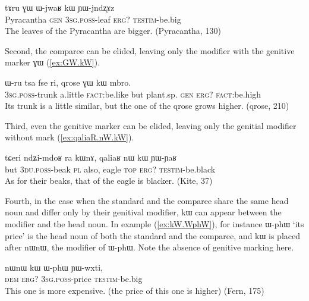 \documentclass[oldfontcommands,oneside,a4paper,11pt]{article}
\newcommand{\ipa}[1]{{\phon #1}} %
\begin{document}
\begin{exe}
\ex \label{ex:GW.WjwaR.kW}
\gll 
\ipa{tɤru}  	\ipa{ɣɯ}  	\ipa{ɯ-jwaʁ}  	\ipa{kɯ}  	\ipa{ɲɯ-jndʐɤz}  \\
Pyracantha \textsc{gen} \textsc{3sg.poss}-leaf \textsc{erg?} \textsc{testim}-be.big \\
\glt The leaves of the Pyracantha are bigger. (Pyracantha, 130)
 \end{exe}
Second,  the comparee can be elided, leaving only the modifier with the genitive marker \ipa{ɣɯ} (\ref{ex:GW.kW}).  
\begin{exe}
\ex \label{ex:GW.kW}
\gll 
\ipa{ɯ-ru}  	\ipa{tsa}  	\ipa{fse}  	\ipa{ri,}  	\ipa{qrose}  	\ipa{ɣɯ}  	\ipa{kɯ}  	\ipa{mbro.}  \\
\textsc{3sg.poss}-trunk a.little \textsc{fact}:be.like but plant.sp. \textsc{gen} \textsc{erg?} \textsc{fact}:be.high \\
\glt Its  trunk is a little similar, but the one of the \ipa{qrose} grows higher. (qrose, 210)
\end{exe}

Third, even the genitive marker can be elided, leaving only the genitial modifier without mark (\ref{ex:qaliaR.nW.kW}).
\begin{exe}
\ex \label{ex:qaliaR.nW.kW}
\gll 
\ipa{tɕeri}  	\ipa{ndʑi-mdoʁ}  	\ipa{ra}  	\ipa{kɯnɤ,}  	\ipa{qaliaʁ}  	\ipa{nɯ}  	\ipa{kɯ}  	\ipa{ɲɯ-ɲaʁ}  \\
but \textsc{3du.poss}-beak \textsc{pl} also, eagle \textsc{top} \textsc{erg?} \textsc{testim}-be.black \\
\glt As for their beaks, that of the eagle is blacker. (Kite, 37)
\end{exe}
Fourth, in the case when   the standard and the comparee share the same head noun and differ only by their genitival modifier, \ipa{kɯ} can appear between the modifier and the head noun. In example (\ref{ex:kW.WphW}), for instance \ipa{ɯ-phɯ} `its price' is the head noun of both the standard and the comparee, and \ipa{kɯ} is placed after \ipa{nɯnɯ}, the  modifier of   \ipa{ɯ-phɯ}. Note the absence of genitive marking here.

 \begin{exe}
\ex \label{ex:kW.WphW}
\gll 
\ipa{nɯnɯ}  	\ipa{kɯ}  	\ipa{ɯ-phɯ}  	\ipa{ɲɯ-wxti,}  \\
\textsc{dem} \textsc{erg?} \textsc{3sg.poss}-price \textsc{testim}-be.big \\
\glt This one is more expensive. (the price of this one is higher) (Fern, 175)
\end{exe}
\end{document}
